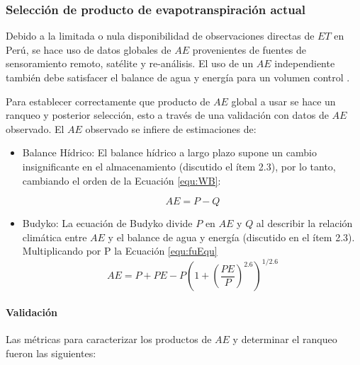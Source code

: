 \documentclass[12pt]{article}
\begin{document}


\subsubsection{Selección de producto de evapotranspiración actual}

Debido a la limitada o nula disponibilidad de observaciones directas de $ET$ en Perú, se hace uso de datos globales de $AE$ provenientes de fuentes de sensoramiento remoto, satélite y re-análisis. El uso de un $AE$ independiente también debe satisfacer el balance de agua y energía para un volumen control \citep{Singh2015}.

Para establecer correctamente que producto de $AE$ global a usar se hace un ranqueo y posterior selección, esto a través de una validación con datos de $AE$ observado. El $AE$ observado se infiere de estimaciones de:

\begin{itemize}

	\item Balance Hídrico: El balance hídrico a largo plazo supone un cambio insignificante en el almacenamiento (discutido el ítem 2.3), por lo tanto, cambiando el orden de la Ecuación \ref{equ:WB}:
	
	\begin{equation}
    AE = P - Q
    \label{equ:bheq}
    \end{equation}

	\item Budyko: La ecuación de Budyko divide $P$ en $AE$ y $Q$ al describir la relación climática entre $AE$ y el balance de agua y energía (discutido en el ítem 2.3). Multiplicando por P la Ecuación \ref{equ:fuEqu}
    \begin{equation}
    AE = P + PE - P\left (1 + \left ( \frac{PE}{P} \right )^{2.6}  \right )^{1/2.6}
    \end{equation}
	
\end{itemize}

\paragraph{Validación}\mbox{}

Las métricas para caracterizar los productos de $AE$ y determinar el ranqueo fueron las siguientes:
\end{document}

